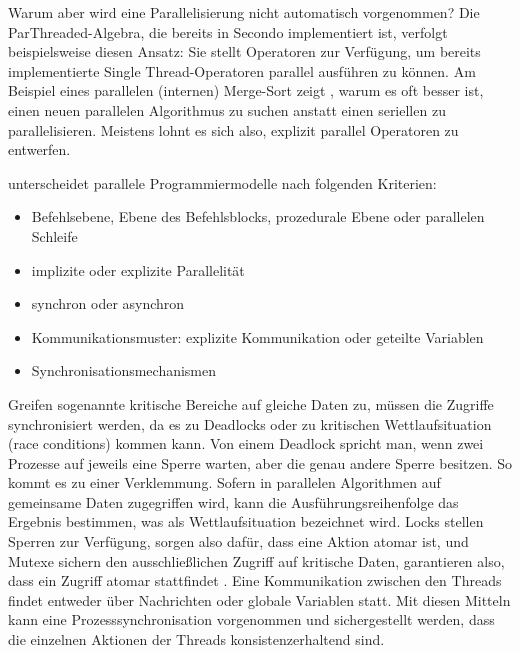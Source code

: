 \documentclass[a4paper,12pt,twoside]{article}
\begin{document}
Warum aber wird eine Parallelisierung nicht automatisch vorgenommen? Die ParThreaded-Algebra, die bereits in Secondo implementiert ist, verfolgt beispielsweise
diesen Ansatz: Sie stellt Operatoren zur Verfügung, um bereits implementierte Single Thread-Operatoren parallel ausführen zu können. Am Beispiel eines parallelen (internen) Merge-Sort zeigt {\textcite{McCool2012}}, warum es oft besser ist, einen neuen parallelen Algorithmus zu suchen anstatt einen seriellen zu parallelisieren. Meistens lohnt es sich also, explizit parallel Operatoren zu entwerfen.

{\textcite[S.104]{Rauber2013}} unterscheidet parallele Programmiermodelle nach folgenden Kriterien:

\begin{itemize}
	\item Befehlsebene, Ebene des Befehlsblocks, prozedurale Ebene oder parallelen%
	Schleife
	\item implizite oder explizite Parallelität
	\item synchron oder asynchron
	\item Kommunikationsmuster: explizite Kommunikation oder geteilte Variablen
	\item Synchronisationsmechanismen
\end{itemize} 

Greifen sogenannte kritische Bereiche auf gleiche Daten zu, müssen die Zugriffe synchronisiert werden, da es zu Deadlocks oder zu kritischen Wettlaufsituation (race conditions) kommen kann. Von einem Deadlock spricht man, wenn zwei Prozesse auf jeweils eine Sperre warten, aber die genau andere Sperre besitzen. So kommt es zu einer Verklemmung. Sofern in parallelen Algorithmen auf gemeinsame Daten zugegriffen wird, kann die Ausführungsreihenfolge das Ergebnis bestimmen, was als Wettlaufsituation bezeichnet wird. Locks stellen Sperren zur Verfügung, sorgen also dafür, dass eine Aktion atomar ist, und Mutexe sichern den ausschließlichen Zugriff auf kritische Daten, garantieren also, dass ein Zugriff atomar stattfindet {\autocite{Rauber2013}}. Eine Kommunikation zwischen den Threads findet entweder über Nachrichten oder globale Variablen statt. Mit diesen Mitteln kann eine Prozesssynchronisation vorgenommen und sichergestellt werden, dass die einzelnen Aktionen der Threads konsistenzerhaltend sind.
\end{document}
